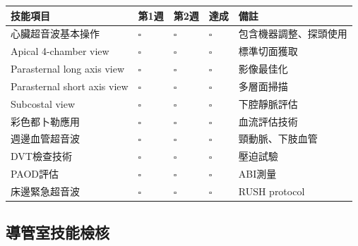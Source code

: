 \documentclass[12pt,a4paper]{article}
\begin{document}
\begin{longtable}{|>{\raggedright\arraybackslash}p{4cm}|>{\raggedright\arraybackslash}p{2cm}|>{\raggedright\arraybackslash}p{2cm}|>{\raggedright\arraybackslash}p{2cm}|>{\raggedright\arraybackslash}p{4cm}|}
\hline
\rowcolor{light_blue}
\textbf{技能項目} & \textbf{第1週} & \textbf{第2週} & \textbf{達成} & \textbf{備註} \\
\hline
心臟超音波基本操作 & $\square$ & $\square$ & $\square$ & 包含機器調整、探頭使用 \\
\hline
Apical 4-chamber view & $\square$ & $\square$ & $\square$ & 標準切面獲取 \\
\hline
Parasternal long axis view & $\square$ & $\square$ & $\square$ & 影像最佳化 \\
\hline
Parasternal short axis view & $\square$ & $\square$ & $\square$ & 多層面掃描 \\
\hline
Subcostal view & $\square$ & $\square$ & $\square$ & 下腔靜脈評估 \\
\hline
彩色都卜勒應用 & $\square$ & $\square$ & $\square$ & 血流評估技術 \\
\hline
週邊血管超音波 & $\square$ & $\square$ & $\square$ & 頸動脈、下肢血管 \\
\hline
DVT檢查技術 & $\square$ & $\square$ & $\square$ & 壓迫試驗 \\
\hline
PAOD評估 & $\square$ & $\square$ & $\square$ & ABI測量 \\
\hline
床邊緊急超音波 & $\square$ & $\square$ & $\square$ & RUSH protocol \\
\hline
\end{longtable}

\subsection{導管室技能檢核}
\end{document}
